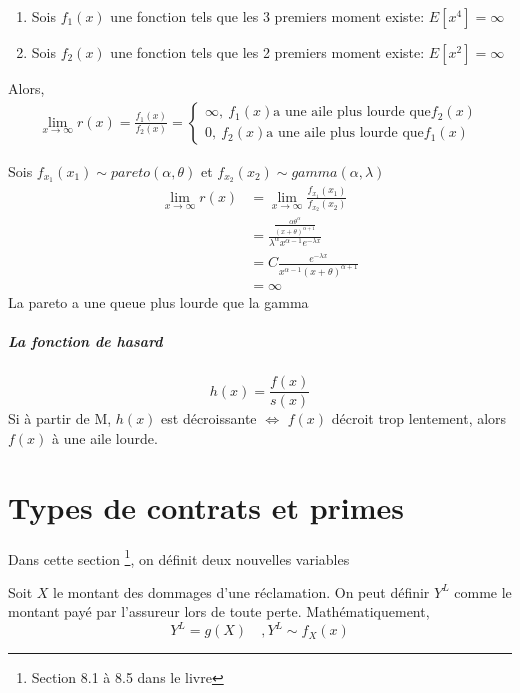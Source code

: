 \documentclass[12pt, french]{report}
\begin{document}
\begin{enumerate}
    \item Sois $f_1(x)$ une fonction tels que les 3 premiers moment existe: $E[x^4] = \infty$
    \item Sois $f_2(x)$ une fonction tels que les 2 premiers moment existe: $E[x^2] = \infty$
\end{enumerate}
Alors,
\begin{align*}
    \lim_{x\to\infty} r(x) = \frac{f_1(x)}{f_2(x)} = \left\{
                                                        \begin{array}{ll}
                                                            \infty ,\: f_1(x) \text{a une aile plus lourde que} f_2(x) \\
                                                            0      ,\: f_2(x) \text{a une aile plus lourde que} f_1(x) 
                                                        \end{array}
                                                    \right.
\end{align*}
\begin{exemple}
    Sois $f_{x_1}(x_1) \sim pareto(\alpha, \theta)$ et $f_{x_2}(x_2) \sim gamma(\alpha, \lambda)$ 
    \begin{align*}
        \lim_{x\to\infty} r(x) &= \lim_{x\to\infty} \frac{f_{x_1}(x_1)}{f_{x_2}(x_2)} \\
                               &= \frac{\frac{\alpha \theta^\alpha}{(x + \theta)^{\alpha + 1}}}{\lambda^\alpha x^{\alpha - 1} e^{-\lambda x}} \\
                               &= C \frac{e^{-\lambda x}}{x^{\alpha - 1} (x + \theta)^{\alpha + 1}} \\
                               &= \infty
    \end{align*}      
    La pareto a une queue plus lourde que la gamma
\end{exemple}

\paragraph{La fonction de hasard}
\begin{equation}
    h(x) = \frac{f(x)}{s(x)}
\end{equation}
Si à partir de M, $h(x)$ est décroissante $\Leftrightarrow$ $f(x)$ décroit trop lentement, alors $f(x)$ à une aile lourde. 




\chapter{Types de contrats et primes}
Dans cette section \footnote{Section 8.1 à 8.5 dans le livre}, on définit deux nouvelles variables
\begin{definition}
Soit $X$ le montant des dommages d'une réclamation. On peut définir $Y^L$ comme le montant payé par l'assureur lors de toute perte. Mathématiquement,
\begin{equation}
Y^L = g(X) \quad , Y^L \sim f_X(x)
\end{equation}
\end{definition}
\end{document}
